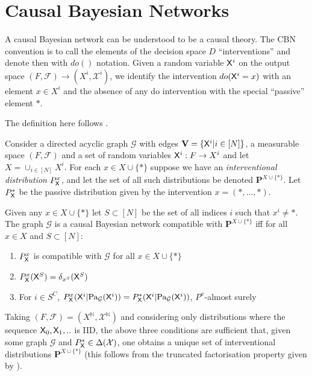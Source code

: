 \section{Causal Bayesian Networks}

A causal Bayesian network can be understood to be a causal theory. The CBN convention is to call the elements of the decision space $D$ ``interventions'' and denote then with $do()$ notation. Given a random variable $\mathsf{X}^i$ on the output space $(F,\mathcal{F})\to (X^i,\mathcal{X}^i)$, we identify the intervention $do(\mathsf{X}^i=x)$ with an element $x\in X^i$ and the absence of any do intervention with the special ``passive'' element $*$.

\begin{definition}\label{def:CBN}
The definition here follows \cite{pearl_causality:_2009}.

Consider a directed acyclic graph $\mathcal{G}$ with edges $\mathbf{V}=\{\mathsf{X}^i|i\in [N]\}$, a measurable space $(F,\mathcal{F})$ and a set of random variables $\mathsf{X}^i:F\to X^i$ and let $X=\cup_{i\in[N]} X^i$. For each $x\in X\cup\{*\}$ suppose we have an \emph{interventional distribution} $P^{x}_{\mathsf{X}}$, and let the set of all such distributions be denoted $\mathbf{P}^{X\cup\{*\}}$. Let $P^*_{\mathsf{X}}$ be the passive distribution given by the intervention $x = (*,...,*)$.

Given any $x\in X\cup\{*\}$ let $S\subset[N]$ be the set of all indices $i$ such that $x^i\neq *$. The graph $\mathcal{G}$ is a causal Bayesian network compatible with $\mathbf{P}^{X\cup\{*\}}$ iff for all $x\in X$ and $S\subset [N]$:
\begin{enumerate}
    \item $P^{x}_{\mathsf{X}}$ is compatible with $\mathcal{G}$ for all $x\in X\cup\{*\}$
    \item $P^x_{\mathsf{X}}(\mathsf{X}^S)=\delta_{x^S}(\mathsf{X}^S)$
    \item For $i\in S^C$, $P^x_{\mathsf{X}}(\mathsf{X}^i|\text{Pa}_{\mathcal{G}}(\mathsf{X}^i))=P^*_{\mathsf{X}}(\mathsf{X}^i|\text{Pa}_{\mathcal{G}}(\mathsf{X}^i))$, $P^x$-almost surely
\end{enumerate}
\end{definition}

Taking $(F,\mathcal{F})=(X^{\mathbb{N}},\mathcal{X}^{\mathbb{N}})$ and considering only distributions where the sequence $\mathsf{X}_0,\mathsf{X}_1,..$ is IID, the above three conditions are sufficient that, given some graph $\mathcal{G}$ and $P^*_{\mathsf{X}}\in \Delta(\mathcal{X})$, one obtains a unique set of interventional distributions $\mathbf{P}^{X\cup\{*\}}$ (this follows from the truncated factorisation property given by \cite{pearl_causality:_2009}). 

